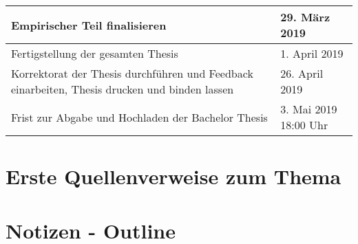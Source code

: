\documentclass{hwz}
\begin{document}
\begin{center}
\begin{tabular}{ | p{8cm} | l |}
    Empirischer Teil finalisieren & 29. März 2019 \\ \hline
    
    Fertigstellung der gesamten Thesis & 1. April 2019 \\ \hline
    
    Korrektorat der Thesis durchführen und Feedback einarbeiten, Thesis drucken und binden lassen & 26. April 2019 \\ \hline
    
    \rowcolor{orange} Frist zur Abgabe und Hochladen der Bachelor Thesis & 3. Mai 2019 18:00 Uhr \\ \hline
    
    \end{tabular}
\end{center}


\newpage
\section{Erste Quellenverweise zum Thema}


\newpage

\section{Notizen - Outline}
\end{document}
